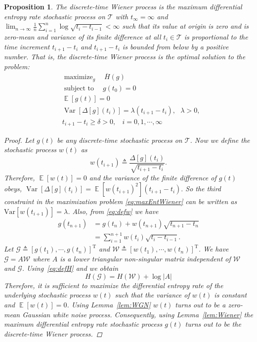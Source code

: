 \documentclass{article}
\DeclareMathOperator*{\maximize}{maximize}
\DeclareMathOperator*{\subj}{subject \  to}
\DeclareMathOperator*{\var}{Var}
\newtheorem{prop}{Proposition}
\newcommand{\E}{\mathop{\mathbb E}}
\renewcommand{\t}[1]{\mathrm{T}#1}
\begin{document}
\begin{prop}
\label{prop:Wiener} The discrete-time Wiener process is the maximum
differential entropy rate stochastic process on $ \mathcal{T}$ with
$t_\infty=\infty$ and $\lim_{n \rightarrow \infty}\frac{1}{n}\sum_{i=1}^n\log\sqrt{t_{i}-t_{i-1}}<\infty$  such that its value at origin is zero and is
zero-mean and variance of its finite difference at all
$t_i\in\mathcal{T}$ is proportional to the time increment
$t_{i+1}-t_{i}$ and $ t_{i+1}-t_{i}$ is bounded from below by a
positive number. That is, the discrete-time Wiener process is the
optimal solution to the problem:
\begin{equation}
\label{eq:maxEntWiener}
 \begin{aligned}
 & \maximize_g 
 \quad \overline{H}(g)\\
 & \subj 
  \quad g(t_0)=0\\
&\E[g(t)]=0\\
 &  \var \left[\Delta[g](t_i)\right]=\lambda (t_{i+1}-t_{i}), \  \ \ \lambda>0, \\
& t_{i+1}-t_{i}\geq \delta>0,\ \ \ \  i=0,1,\cdots,\infty
\end{aligned}
\end{equation}

\begin{proof}
Let  $g(t)$ be any discrete-time stochastic process on
$\mathcal{T}$. Now we define the stochastic process $w(t)$ as
\begin{equation}
\label{eq:defw}
w(t_{i+1})\triangleq\frac{\Delta[g](t_i)}{\sqrt{t_{i+1}-t_{i}}}.
\end{equation}
Therefore, $\E[w(t)]=0$ and the variance of the finite difference of $g(t)$ obeys, $\var\left[{\Delta[g](t_i)}\right]=\E\left[w(t_{i+1})^2\right]({t_{i+1}-t_{i}}).$
So the third constraint in the maximization problem
\eqref{eq:maxEntWiener} can be written as
$\text{Var}[w(t_{i+1})]=\lambda$. Also, from \eqref{eq:defw} we
have\begin{align}
g(t_{n+1})&=g(t_{n})+w(t_{n+1})\sqrt{t_{n+1}-t_{n} } \\
& =\sum_{i=1}^{n+1}{w(t_i)\sqrt{t_i-t_{i-1}}}.
\end{align}
Let $\mathcal{G}\triangleq[g(t_1), \cdots ,g(t_n)]^\t{}$ and
$\mathcal{W}\triangleq[w(t_1), \cdots ,w(t_n)]^\t{}$. We have
$\mathcal{G}=A\mathcal{W}$ where $A$ is a lower triangular
non-singular matrix independent of $\mathcal{W}$ and $\mathcal{G}$.
Using~\eqref{eq:defH} and \cite[Corollary to Theorem 8.6.4]{Cover}
we obtain
\begin{equation}
H(\mathcal{G})=H(\mathcal{W})+\log |A|
\end{equation}
Therefore, it is sufficient to maximize the differential entropy
rate of the underlying stochastic process $w(t)$ such that the
variance of $w(t)$ is constant and $\E[w(t)]=0$. Using Lemma~\ref{lem:WGN} $w(t)$
turns out to be a zero-mean Gaussian white noise process. Consequently, using
Lemma~\ref{lem:Wiener} the maximum differential entropy rate
stochastic process $g(t)$ turns out to be the discrete-time Wiener
process.
\end{proof}
\end{prop}
\end{document}
